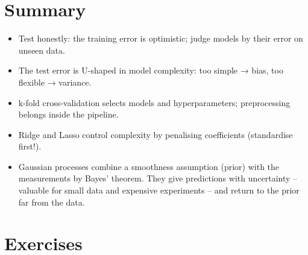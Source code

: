 \documentclass[
  letterpaper,
  DIV=11,
  numbers=noendperiod]{scrreprt}
\providecommand{\tightlist}{%
  \setlength{\itemsep}{0pt}\setlength{\parskip}{0pt}}\usepackage{longtable,booktabs,array}
\begin{document}
\section{Summary}\label{summary-6}

\begin{tcolorbox}[enhanced jigsaw, left=2mm, title=\textcolor{quarto-callout-important-color}{\faExclamation}\hspace{0.5em}{Key takeaways}, opacityback=0, breakable, rightrule=.15mm, arc=.35mm, toptitle=1mm, colbacktitle=quarto-callout-important-color!10!white, opacitybacktitle=0.6, coltitle=black, colframe=quarto-callout-important-color-frame, bottomrule=.15mm, leftrule=.75mm, bottomtitle=1mm, titlerule=0mm, toprule=.15mm, colback=white]

\begin{itemize}
\tightlist
\item
  Test honestly: the training error is optimistic; judge models by their
  error on unseen data.
\item
  The test error is U-shaped in model complexity: too simple → bias, too
  flexible → variance.
\item
  k-fold cross-validation selects models and hyperparameters;
  preprocessing belongs inside the pipeline.
\item
  Ridge and Lasso control complexity by penalising coefficients
  (standardise first!).
\item
  Gaussian processes combine a smoothness assumption (prior) with the
  measurements by Bayes' theorem. They give predictions with uncertainty
  -- valuable for small data and expensive experiments -- and return to
  the prior far from the data.
\end{itemize}

\end{tcolorbox}

\section{Exercises}\label{exercises-6}
\end{document}
